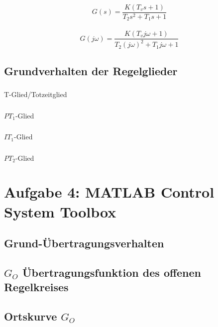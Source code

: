 \documentclass{article}
\begin{document}
			\subsubsection{}
				$$G(s) = \frac{K(T_vs+1)}{T_2s^2 + T_1s + 1}$$
				\\
				$$G(j\omega) = \frac{K(T_vj\omega + 1)}{T_2(j\omega)^2 + T_1j\omega + 1}$$
		\newpage
		\subsection{Grundverhalten der Regelglieder}		
			\subsubsection{}
				T-Glied/Totzeitglied
			\subsubsection{}
				$PT_1$-Glied
			\subsubsection{}
				$IT_1$-Glied
			\subsubsection{}
				$PT_2$-Glied
	\newpage
	\section{Aufgabe 4: MATLAB Control System Toolbox}
		\subsection{Grund-Übertragungsverhalten}
		\subsection{$G_O$ Übertragungsfunktion des offenen Regelkreises}
		\subsection{Ortskurve $G_O$}
	
\end{document}
